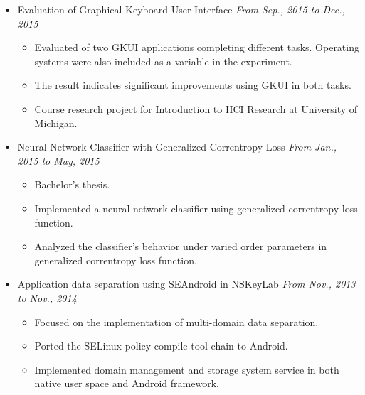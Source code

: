 \documentclass[letterpaper,11pt]{article}
\newenvironment{extra}{}{}
\begin{document}
\begin{itemize}
\begin{extra}
    \item Evaluation of Graphical Keyboard User Interface \hfill \textit{From Sep., 2015 to Dec., 2015}
    \begin{itemize}
        \item Evaluated of two GKUI applications completing different tasks. Operating systems were also
included as a variable in the experiment.
        \item The result indicates significant improvements using GKUI in both tasks.
        \item Course research project for Introduction to HCI Research at University of Michigan.
    \end{itemize}
\end{extra}

    \item Neural Network Classifier with Generalized Correntropy Loss \hfill \textit{From Jan., 2015 to
May, 2015}
    \begin{itemize}
        \item Bachelor's thesis.
        \item Implemented a neural network classifier using generalized correntropy loss function.
        \item Analyzed the classifier's behavior under varied order parameters in generalized correntropy loss
function.
    \end{itemize}

\begin{extra}
    \item Application data separation using SEAndroid in NSKeyLab \hfill \textit{From Nov., 2013 to Nov., 2014}
    \begin{itemize}
        \item Focused on the implementation of multi-domain data separation.
        \item Ported the SELinux policy compile tool chain to Android.
        \item Implemented domain management and storage system service in both native user space and Android
framework.
    \end{itemize}
\end{extra}


\end{itemize}
\end{document}
